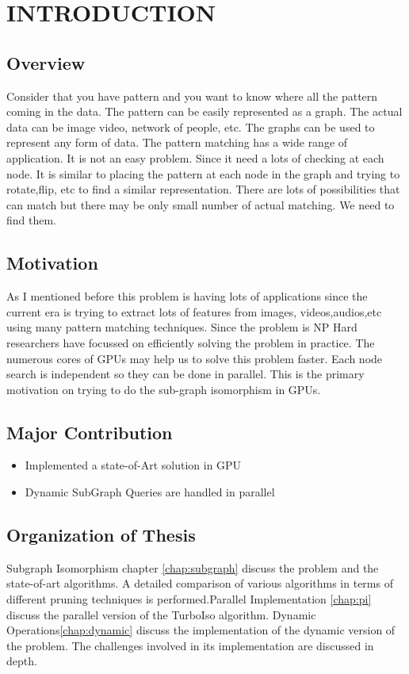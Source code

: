 \chapter{INTRODUCTION}
\label{chap:intro}
\section{Overview}
Consider that you have pattern and you want to know where all the pattern coming in the data. The pattern can be easily represented as a graph. The actual data can be image video, network of people, etc. The graphs can be used to represent any form of data. The pattern matching has a wide range of application. It is not an easy problem. Since it need a lots of checking at each node. It is similar to placing the pattern at each node in the graph and trying to rotate,flip, etc to find a similar representation. There are lots of possibilities that can match but there may be only small number of actual matching. We need to find them.
\section{Motivation}
As I mentioned before this problem is having lots of applications since the current era is trying to extract lots of features from images, videos,audios,etc using many pattern matching techniques.  Since the problem is NP Hard researchers have focussed on efficiently solving the problem in practice. The numerous cores of GPUs may help us to solve this problem faster. Each node search is independent so they can be done in parallel. This is the  primary motivation on trying to do the sub-graph isomorphism in GPUs. 
\section{Major Contribution}
\begin{itemize}
	\item{Implemented a state-of-Art solution in GPU}
	\item{Dynamic SubGraph Queries are handled in parallel}
\end{itemize}

\section{Organization of Thesis}
	Subgraph Isomorphism chapter \ref{chap:subgraph} discuss the problem and the state-of-art algorithms. A detailed comparison of various algorithms in terms of different pruning techniques is performed.Parallel Implementation \ref{chap:pi} discuss the parallel version of the TurboIso algorithm. Dynamic Operations\ref{chap:dynamic} discuss the implementation of the dynamic version of the problem. The challenges involved in its implementation are discussed in depth.